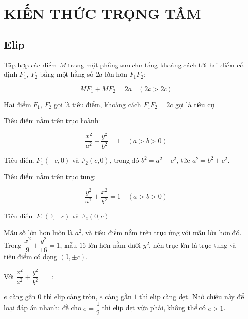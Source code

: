 \documentclass[11pt, a4paper]{article}
\begin{document}
\section{KIẾN THỨC TRỌNG TÂM}

\subsection{Elip}

\begin{dinhnghia}[{1 — Elip}]
Tập hợp các điểm $M$ trong mặt phẳng sao cho tổng khoảng cách tới hai điểm cố định $F_1$, $F_2$ bằng một hằng số $2a$ lớn hơn $F_1F_2$:

$$MF_1 + MF_2 = 2a \quad (2a > 2c)$$

Hai điểm $F_1$, $F_2$ gọi là tiêu điểm, khoảng cách $F_1F_2 = 2c$ gọi là tiêu cự.
\end{dinhnghia}
\begin{dinhly}
Tiêu điểm nằm trên trục hoành:

$$\frac{x^2}{a^2} + \frac{y^2}{b^2} = 1 \quad (a > b > 0)$$

Tiêu điểm $F_1(-c, 0)$ và $F_2(c, 0)$, trong đó $b^2 = a^2 - c^2$, tức $a^2 = b^2 + c^2$.

Tiêu điểm nằm trên trục tung:

$$\frac{y^2}{a^2} + \frac{x^2}{b^2} = 1 \quad (a > b > 0)$$

Tiêu điểm $F_1(0, -c)$ và $F_2(0, c)$.

 Mẫu số lớn hơn luôn là $a^2$, và tiêu điểm nằm trên trục ứng với mẫu lớn hơn đó. Trong $\dfrac{x^2}{9} + \dfrac{y^2}{16} = 1$, mẫu $16$ lớn hơn nằm dưới $y^2$, nên trục lớn là trục tung và tiêu điểm có dạng $(0, \pm c)$.
\end{dinhly}
\begin{dinhly}
Với $\dfrac{x^2}{a^2} + \dfrac{y^2}{b^2} = 1$:


 $e$ càng gần $0$ thì elip càng tròn, $e$ càng gần $1$ thì elip càng dẹt. Nhớ chiều này để loại đáp án nhanh: đề cho $e = \dfrac{1}{2}$ thì elip dẹt vừa phải, không thể có $e > 1$.
\end{dinhly}
\end{document}
